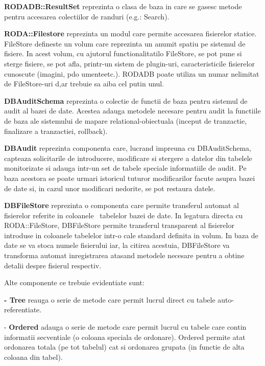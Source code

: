\documentclass[a4paper]{article}
\begin{document}
{\bigskip

{
\textbf{RODADB::ResultSet} reprezinta o clasa de baza in care se gasesc metode pentru accesarea colectiilor de randuri
(e.g.: Search).}


\bigskip

{
\textbf{RODA::Filestore} reprezinta un modul care permite accesarea fisierelor statice. FileStore defineste un volum
care reprezinta un anumit spatiu pe sistemul de fisiere. In acest volum, cu ajutorul functionalitatilo FileStore, se
pot pune si sterge fisiere, se pot afla, printr-un sistem de plugin-uri, caracteristicile fisierelor cunoscute
(imagini, pdo umenteetc.). RODADB poate utiliza un numar nelimitat de FileStore-uri d,ar trebuie sa aiba cel putin
unul.}


\bigskip

{
\textbf{DBAuditSchema} reprezinta o colectie de functii de baza pentru sistemul de audit al bazei de date. Acestea
adauga metodele necesare pentru audit la functiile de baza ale sistemului de mapare relational-obiectuala (inceput de
tranzactie, finalizare a tranzactiei, rollback).}


\bigskip

{
\textbf{DBAudit} reprezinta componenta care, lucrand impreuna cu DBAuditSchema, capteaza solicitarile de introducere,
modificare si stergere a datelor din tabelele monitorizate si adauga intr-un set de tabele speciale informatiile de
audit. Pe baza acestora se poate urmari istoricul tuturor modificarilor facute asupra bazei de date si, in cazul unor
modificari nedorite, se pot restaura datele.}


\bigskip

{
\textbf{DBFileStore} reprezinta o componenta care permite transferul automat al fisierelor referite in coloanele
\ tabelelor bazei de date. In legatura directa cu RODA::FileStore, DBFileStore permite transferul transparent al
fisierelor introduse in coloanele tabelelor intr-o cale standard definita in volum. In baza de date se va stoca numele
fisierului iar, la citirea acestuia, DBFileStore va transforma automat inregistrarea atasand metodele necesare pentru a
obtine detalii despre fisierul respectiv.}


\bigskip

{
Alte componente ce trebuie evidentiate sunt:}

{
\textbf{{}- Tree} reauga o serie de metode care permit lucrul direct cu tabele auto-referentiate.}

{
{}- \textbf{Ordered} adauga o serie de metode care permit lucrul cu tabele care contin informatii secventiale (o coloana
speciala de ordonare). Ordered permite atat ordonarea totala (pe tot tabelul) cat si ordonarea grupata (in functie de
alta coloana din tabel).}


}
\end{document}
